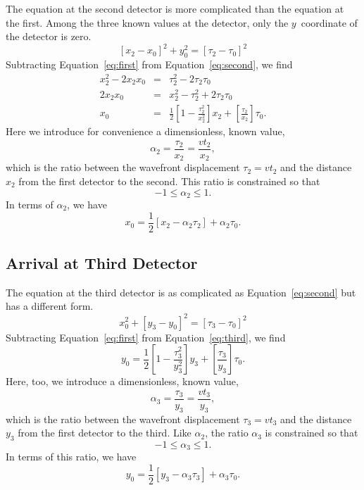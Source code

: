 \documentclass[twocolumn]{article}
\begin{document}
The equation at the second detector is more complicated than the equation at
the first.  Among the three known values at the detector, only the
$y$~coordinate of the detector is zero.
\begin{equation}
   \left[x_2 - x_0\right]^2 + y_0^2 = \left[\tau_2 - \tau_0\right]^2
   \label{eq:second}
\end{equation}
Subtracting Equation~\ref{eq:first} from Equation~\ref{eq:second}, we find
\begin{eqnarray}
   \nonumber
   x_2^2 - 2 x_2 x_0 &=& \tau_2^2 - 2 \tau_2 \tau_0\\
   \nonumber
   2 x_2 x_0 &=& x_2^2 - \tau_2^2 + 2 \tau_2 \tau_0\\
   x_0 &=& \frac{1}{2}\left[1 - \frac{\tau_2^2}{x_2^2}\right] x_2 +
           \left[\frac{\tau_2}{x_2}\right] \tau_0.
\end{eqnarray}
Here we introduce for convenience a dimensionless, known value,
\begin{equation}
   \alpha_2 = \frac{\tau_2}{x_2} = \frac{v t_2}{x_2},
\end{equation}
which is the ratio between the wavefront displacement $\tau_2 = vt_2$ and the
distance $x_2$ from the first detector to the second.  This ratio is constrained
so that
\begin{equation}
   -1 \leq \alpha_2 \leq 1.
\end{equation}
In terms of $\alpha_2$, we have
\begin{equation}
   x_0 = \frac{1}{2}\left[x_2 - \alpha_2\tau_2\right] + \alpha_2\tau_0.
   \label{eq:t-x}
\end{equation}

\subsection{Arrival at Third Detector}

The equation at the third detector is as complicated as
Equation~\ref{eq:second} but has a different form.
\begin{equation}
   x_0^2 + \left[y_3 - y_0\right]^2 = \left[\tau_3 - \tau_0\right]^2
   \label{eq:third}
\end{equation}
Subtracting Equation~\ref{eq:first} from Equation~\ref{eq:third}, we find
\begin{equation}
   y_0 = \frac{1}{2}\left[1 - \frac{\tau_3^2}{y_3^2}\right] y_3 +
         \left[\frac{\tau_3}{y_3}\right] \tau_0.
\end{equation}
Here, too, we introduce a dimensionless, known value,
\begin{equation}
   \alpha_3 = \frac{\tau_3}{y_3} = \frac{v t_3}{y_3},
\end{equation}
which is the ratio between the wavefront displacement $\tau_3 = vt_3$ and the
distance $y_3$ from the first detector to the third.  Like $\alpha_2$, the
ratio $\alpha_3$ is constrained so that
\begin{equation}
   -1 \leq \alpha_3 \leq 1.
\end{equation}
In terms of this ratio, we have
\begin{equation}
   y_0 = \frac{1}{2}\left[y_3 - \alpha_3\tau_3\right] + \alpha_3\tau_0.
   \label{eq:t-y}
\end{equation}
\end{document}
